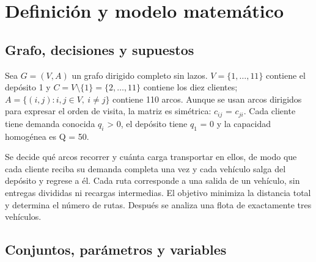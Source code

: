 \documentclass[11pt,a4paper]{article}
\numberwithin{equation}{section}
\begin{document}
\Needspace{110pt}

\section{Definición y modelo matemático}

\Needspace{110pt}

\subsection{Grafo, decisiones y supuestos}

Sea \(G=(V,A)\) un grafo dirigido completo sin lazos. \(V=\{1,\ldots,11\}\) contiene el depósito 1 y \(C=V\setminus\{1\}=\{2,\ldots,11\}\) contiene los diez clientes; \(A=\{(i,j):i,j\in V,\ i\ne j\}\) contiene 110 arcos. Aunque se usan arcos dirigidos para expresar el orden de visita, la matriz es simétrica: \(c_{ij}\) = \(c_{ji}\). Cada cliente tiene demanda conocida \(q_i\) > 0, el depósito tiene \(q_1\) = 0 y la capacidad homogénea es Q = 50.


Se decide qué arcos recorrer y cuánta carga transportar en ellos, de modo que cada cliente reciba su demanda completa una vez y cada vehículo salga del depósito y regrese a él. Cada ruta corresponde a una salida de un vehículo, sin entregas divididas ni recargas intermedias. El objetivo minimiza la distancia total y determina el número de rutas. Después se analiza una flota de exactamente tres vehículos.


\Needspace{350pt}

\subsection{Conjuntos, parámetros y variables}

\Needspace{260pt}
\end{document}
